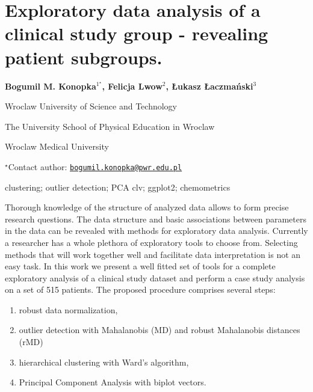 \documentclass[\main/boa.tex]{subfiles}
\begin{document}
\section{Exploratory data analysis of a clinical study group - revealing patient
subgroups.}

\begin{center}
  {\bf Bogumil M. Konopka$^{1^\star}$, Felicja Lwow$^{2}$, Łukasz Łaczmański$^{3}$}
\end{center}

\vskip 0.3cm

\begin{affiliations}
\begin{enumerate}
\begin{minipage}{0.915\textwidth}
\centering
\item Wroclaw University of Science and Technology \\[-2pt]
\item The University School of Physical Education in Wroclaw \\[-2pt]
\item Wroclaw Medical University \\[-2pt]
\end{minipage}
\end{enumerate}
$^\star$Contact author: \href{mailto:bogumil.konopka@pwr.edu.pl}{\nolinkurl{bogumil.konopka@pwr.edu.pl}}\\
\end{affiliations}

\vskip 0.5cm

\begin{minipage}{0.915\textwidth}
\keywords clustering; outlier detection; PCA
\packages clv; ggplot2; chemometrics
\end{minipage}

\vskip 0.8cm

Thorough knowledge of the structure of analyzed data allows to form
precise research questions. The data structure and basic associations
between parameters in the data can be revealed with methods for
exploratory data analysis. Currently a researcher has a whole plethora
of exploratory tools to choose from. Selecting methods that will work
together well and facilitate data interpretation is not an easy task. In
this work we present a well fitted set of tools for a complete
exploratory analysis of a clinical study dataset and perform a case
study analysis on a set of 515 patients. The proposed procedure
comprises several steps:

\begin{enumerate}
\def\labelenumi{\arabic{enumi}.}
\tightlist
\item
  robust data normalization,
\item
  outlier detection with Mahalanobis (MD) and robust Mahalanobis
  distances (rMD)
\item
  hierarchical clustering with Ward's algorithm,
\item
  Principal Component Analysis with biplot vectors.
\end{enumerate}
\end{document}
